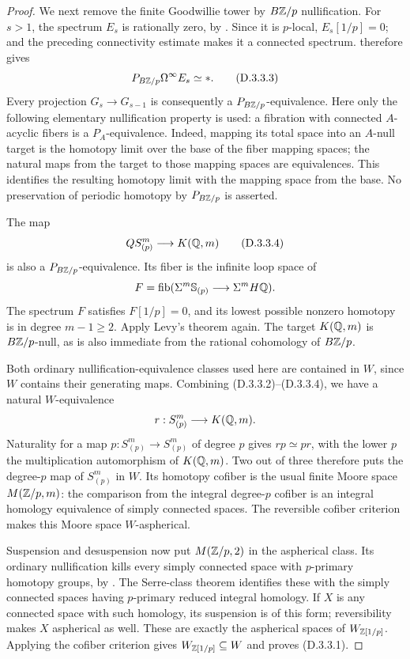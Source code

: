 \begin{proof}
We next remove the finite Goodwillie tower by $B\mathbb Z/p$
nullification. For $s>1$, the spectrum $E_s$ is rationally
zero, by \cite[Proposition~3.1]{EH5AroneMahowald1999}.
Since it is $p$-local, $E_s[1/p]=0$; and the preceding
connectivity estimate makes it a connected spectrum.
\cite[Theorem~3.2]{EH5Levy2025} therefore gives
\[
                    P_{B\mathbb Z/p}\Omega^\infty E_s\simeq *.
 \tag{D.3.3.3}
\]
Every projection $G_s\to G_{s-1}$ is consequently a
$P_{B\mathbb Z/p}$-equivalence. Here only the following elementary
nullification property is used: a fibration with connected
$A$-acyclic fibers is a $P_A$-equivalence. Indeed, mapping its
total space into an $A$-null target is the homotopy limit over
the base of the fiber mapping spaces; the natural maps from
the target to those mapping spaces are equivalences. This
identifies the resulting homotopy limit with the mapping space
from the base. No preservation of periodic homotopy by
$P_{B\mathbb Z/p}$ is asserted.

The map
\[
                 QS^m_{(p)}\longrightarrow K(\mathbb Q,m)
 \tag{D.3.3.4}
\]
is also a $P_{B\mathbb Z/p}$-equivalence. Its fiber is the infinite
loop space of
\[
     F=\operatorname{fib}(\Sigma^m\mathbb S_{(p)}
                            \longrightarrow\Sigma^mH\mathbb Q).
\]
The spectrum $F$ satisfies $F[1/p]=0$, and its lowest possible
nonzero homotopy is in degree $m-1\geq2$. Apply Levy's theorem
again. The target $K(\mathbb Q,m)$ is $B\mathbb Z/p$-null, as is also
immediate from the rational cohomology of $B\mathbb Z/p$.

Both ordinary nullification-equivalence classes used here are
contained in $W$, since $W$ contains their generating maps.
Combining (D.3.3.2)--(D.3.3.4), we have a natural $W$-equivalence
\[
                         r:S^m_{(p)}\longrightarrow K(\mathbb Q,m).
\]
Naturality for a map $p:S^m_{(p)}\to S^m_{(p)}$ of degree $p$
gives $r p\simeq p r$, with the lower $p$ the multiplication
automorphism of $K(\mathbb Q,m)$. Two out of three therefore puts
the degree-$p$ map of $S^m_{(p)}$ in $W$. Its homotopy cofiber
is the usual finite Moore space $M(\mathbb Z/p,m)$: the comparison
from the integral degree-$p$ cofiber is an integral homology
equivalence of simply connected spaces. The reversible cofiber
criterion makes this Moore space $W$-aspherical.

Suspension and desuspension now put $M(\mathbb Z/p,2)$ in the
aspherical class. Its ordinary nullification kills every
simply connected space with $p$-primary homotopy groups, by
\cite[Theorem~7.5]{EH5Bousfield1997}. The Serre-class theorem
identifies these with the simply connected spaces having
$p$-primary reduced integral homology. If $X$ is any connected
space with such homology, its suspension is of this form;
reversibility makes $X$ aspherical as well. These are exactly
the aspherical spaces of $W_{\mathbb Z[1/p]}$. Applying the cofiber
criterion gives $W_{\mathbb Z[1/p]}\subseteq W$ and proves (D.3.3.1).
\end{proof}
